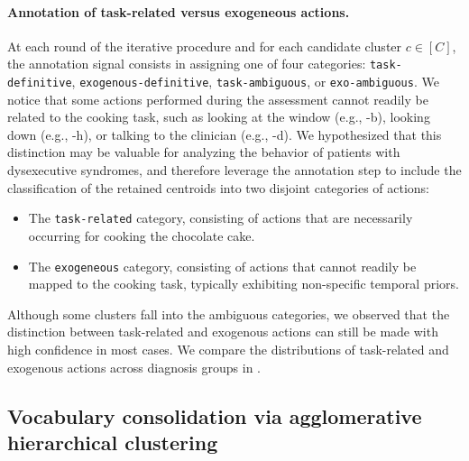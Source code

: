         \paragraph{Annotation of task-related versus exogeneous actions.\\}
        
        
        At each round of the iterative procedure and for each candidate cluster $c \in [C]$, the annotation signal consists in assigning one of four categories: \texttt{task-definitive}, \texttt{exogenous-definitive}, \texttt{task-ambiguous}, or \texttt{exo-ambiguous}. We notice that some actions performed during the assessment cannot readily be related to the cooking task, such as looking at the window (e.g., -b), looking down (e.g., -h), or talking to the clinician (e.g., -d). We hypothesized that this distinction may be valuable for analyzing the behavior of patients with dysexecutive syndromes, and therefore leverage the annotation step to include the classification of the retained centroids into two disjoint categories of actions: 
        \begin{itemize}
            \item The \texttt{task-related} category, consisting of actions that are necessarily occurring for cooking the chocolate cake.
            \item The \texttt{exogeneous} category, consisting of actions that cannot readily be mapped to the cooking task, typically exhibiting non-specific temporal priors. 
        \end{itemize}

        Although some clusters fall into the ambiguous categories, we observed that the distinction between task-related and exogenous actions can still be made with high confidence in most cases. We compare the distributions of task-related and exogenous actions across diagnosis groups in .


    \subsection{Vocabulary consolidation via agglomerative hierarchical clustering}
        \label{sec:chapter_5_hierarchical_multiview_clustering}

